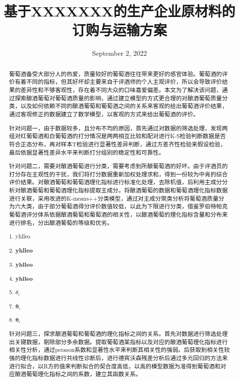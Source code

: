 \documentclass[UTF8]{ctexart}
\title{基于\textbf{XXXXX}XX的生产企业原材料的订购与运输方案}
\date{September 2, 2022}
\begin{document}
\maketitle{}
\renewcommand{\abstractname}{\Large 摘要\\}
\begin{abstract}
	\normalsize
	葡萄酒备受大部分人的热爱，质量较好的葡萄酒往往带来更好的感官体验。葡萄酒的评价有着不同的指标，但其好坏却主要来自于评酒师的个人主观评价，所以会导致评价结果的差异性和不够客观性，存在着不同大众的口味喜爱偏差。本文为了解决该问题，通过探索酿酒葡萄对葡萄酒质量的影响，通过建立模型的方式更合理的对酿酒葡萄质量分类，以及如何依赖不同的酿酒葡萄和葡萄酒之间的关系来客观的给出葡萄酒评价结果，通过客观修正的数据建立了数学模型，以客观的方式来给出葡萄酒的评价。

	针对问题一，由于数据较多，且分布不均的原因，首先通过对数据的筛选处理，发现两组对红葡萄酒和白葡萄酒的打分情况是两两相互比较和配对进行K-S检验判断数据是否符合正态分布，再对样本T检验进行显著性差异判断，通过方差齐性检验来假设检验，最后依据显著性差异水平来判断打分组别的稳定性和可靠性。

	针对问题二，需要对酿酒葡萄进行分类，需要考虑到所酿葡萄酒的好坏。由于评酒员的打分存在主观性的干扰，我们将打分数据重新加权处理求和，得到一份较为中肯的综合评价结果。对酿酒葡萄和葡萄酒理化指标进行标准化处理，去除机值，后利用主成分分析对酿酒葡萄和葡萄酒理化指标提取主成分。将酿酒葡萄的数据和葡萄酒理化指标数据进行关联，采用改进的K-means++分类模型，通过对主成分聚类分析将葡萄酒质量分为六大类，由于部分葡萄酒得分评价数值较低，以此为下限进行分类，借鉴罗伯特帕克葡萄酒评分体系依据酿酒葡萄和葡萄酒的相关性，以酿酒葡萄的理化指标含量和分布来进行排名，分出酿酒葡萄的等级和优劣。


	1. yhlleo

	2. \textbf{yhlleo}

	3. $\textbf{yhlleo}$

	4. $\mathbf{yhlleo}$

	5. $\theta_i$


	7. $\mathbf{\theta}_i$

	8. $\pmb{\theta}_i$


	针对问题三，探求酿酒葡萄和葡萄酒的理化指标之间的关系。首先对数据进行筛选处理出关键数据，剔除部分多余数据。提取葡萄酒某指标以及对应的酿酒葡萄理化指标进行相关性分析，通过perason系数和显著性水平来判断其相关性的强弱。后获取到相关性较强的理化指标数据进行共线性诊断后，进行德宾沃森残差分析后通过多元回归的方法来进行拟合，以R方的值来判断拟合的契合度高低，以高的模型数据为准得到葡萄酒和对应酿酒葡萄理化指标之间的系数，建立其函数关系。


\end{abstract}
\end{document}
